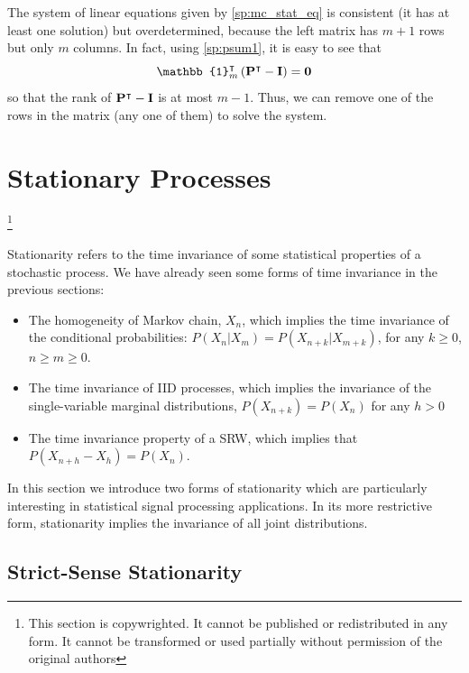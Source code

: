 The system of linear equations given by \eqref{sp:mc_stat_eq} is consistent (it has at least one solution) but overdetermined, because the left matrix has $m+1$ rows but only $m$ columns. In fact, using \eqref{sp:psum1}, it is easy to see that 
\begin{equation}
\mathbb{1}_m^\intercal \left({\bf P}^\intercal - {\bf I}\right)  = {\bf 0}
\end{equation}
so that the rank of ${\bf P}^\intercal - {\bf I}$ is at most $m-1$. Thus, we can remove one of the rows in the matrix (any one of them) to solve the system.

\newpage


\section{Stationary Processes}
\footnote{This section is copywrighted. It cannot be published or redistributed in any form. It cannot be transformed or used partially without permission of the original authors}

Stationarity refers to the time invariance of some statistical properties of a stochastic process. We have already seen some forms of time invariance in the previous sections: 

\begin{itemize}
\item The homogeneity of Markov chain, $X_n$, which implies the time invariance of the conditional probabilities: $P(X_n|X_m) = P(X_{n+k}|X_{m+k})$, for any $k \ge 0$, $n \ge m \ge 0$. 
\item The time invariance of IID processes, which implies the invariance of the single-variable marginal distributions, $P(X_{n+k}) = P(X_n)$ for any $h>0$
\item The time invariance property of a SRW, which implies that $P(X_{n+h}-X_h) = P(X_n)$.
\end{itemize}

In this section we introduce two forms of stationarity which are particularly interesting in statistical signal processing applications. In its more restrictive form, stationarity implies the invariance of all joint distributions.

\subsection{Strict-Sense Stationarity}
\label{sec:Stationarity}

